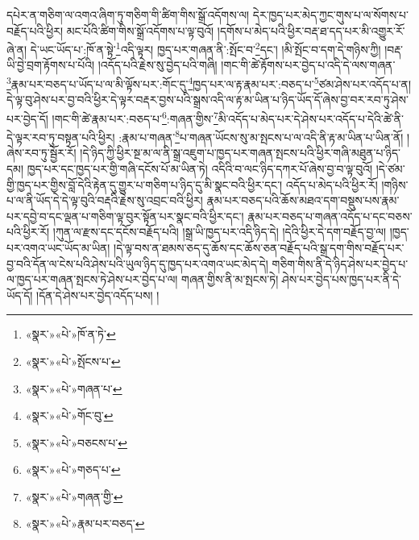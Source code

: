 དཔེར་ན་གཅིག་ལ་འགའ་ཞིག་ཏུ་གཅིག་གི་ཚིག་གིས་སྒྲོ་འདོགས་ལ། དེར་ཁྱད་པར་མེད་ཀྱང་གུས་པ་ལ་སོགས་པ་བརྗོད་པའི་ཕྱིར། མང་པོའི་ཚིག་གིས་སྒྲོ་འདོགས་པ་ལྟ་བུའོ། །དགོས་པ་མེད་པའི་ཕྱིར་བརྡ་ཐ་དད་པར་མི་འགྱུར་རོ་ཞེ་ན། དེ་ཡང་ཡོད་པ་:ཁོ་ན་སྟེ་\footnote{«སྣར་»«པེ་»ཁོ་ན་ཏེ་}འདི་ལྟར། ཁྱད་པར་གཞན་ནི་:སྤོང་བ་\footnote{«སྣར་»«པེ་»སྤོངས་པ་}དང་། །མི་སྤོང་བ་དག་དེ་གཉིས་ཀྱི། །བརྡ་ཡི་བྱེ་བྲག་རྟོགས་པ་པོའི། །འདོད་པའི་རྗེས་སུ་བྱེད་པའི་གཞི། །གང་གི་ཚེ་རྟོགས་པར་བྱེད་པ་འདི་དེ་ལས་གཞན་\footnote{«སྣར་»«པེ་»གཞན་པ་}རྣམ་པར་བཅད་པ་ཡོད་པ་ལ་མི་ལྟོས་པར་:གོང་དུ་\footnote{«སྣར་»«པེ་»གོང་བུ་}ཁྱད་པར་ལ་རྟ་རྣམ་པར་:བཅད་པ་\footnote{«སྣར་»«པེ་»བཅངས་པ་}ཙམ་ཤེས་པར་འདོད་པ་ན། དེ་ལྟ་བུ་ཤེས་པར་བྱ་བའི་ཕྱིར་དེ་ལྟར་བརྡར་བྱས་པའི་སྒྲས་འདི་ལ་རྟ་མ་ཡིན་པ་ཉིད་ཡོད་དོ་ཞེས་བྱ་བར་རབ་ཏུ་ཤེས་པར་བྱེད་དོ། །གང་གི་ཚེ་རྣམ་པར་:བཅད་པ་\footnote{«སྣར་»«པེ་»གཅད་པ་}:གཞན་གྱིས་\footnote{«སྣར་»«པེ་»གཞན་གྱི་}མི་འདོད་པ་མེད་པར་དེ་ཤེས་པར་འདོད་པ་དེའི་ཚེ་ནི་དེ་ལྟར་རབ་ཏུ་བསྟན་པའི་ཕྱིར། :རྣམ་པ་གཞན་\footnote{«སྣར་»«པེ་»རྣམ་པར་བཅད་}པ་གཞན་ཡོངས་སུ་མ་སྤངས་པ་ལ་འདི་ནི་རྟ་མ་ཡིན་པ་ཡིན་ནོ། །ཞེས་རབ་ཏུ་སྦྱོར་རོ། །དེ་ཉིད་ཀྱི་ཕྱིར་སྔ་མ་ལ་ནི་སྒྲ་འཇུག་པ་ཁྱད་པར་གཞན་སྤངས་པའི་ཕྱིར་གཞི་མཐུན་པ་ཉིད་དམ། ཁྱད་པར་དང་ཁྱད་པར་གྱི་གཞི་དངོས་པོ་མ་ཡིན་ཏེ། འདིའི་བ་ལང་ཉིད་དཀར་པོ་ཞེས་བྱ་བ་ལྟ་བུའོ། །དེ་ཙམ་གྱི་ཁྱད་པར་གྱིས་བློ་དེའི་རྟེན་དུ་གྱུར་པ་གཅིག་པ་ཉིད་དུ་མི་སྣང་བའི་ཕྱིར་དང་། འདོད་པ་མེད་པའི་ཕྱིར་རོ། །གཉིས་པ་ལ་ནི་ཡོད་དེ་དེ་ལྟ་བུའི་བརྡའི་རྗེས་སུ་འབྲང་བའི་ཕྱིར། རྣམ་པར་བཅད་པའི་ཆོས་མཐའ་དག་བསྡུས་པས་རྣམ་པར་དབྱེ་བ་དང་ལྡན་པ་གཅིག་ལྟ་བུར་སྟོན་པར་སྣང་བའི་ཕྱིར་དང་། རྣམ་པར་བཅད་པ་གཞན་འདོད་པ་དང་བཅས་པའི་ཕྱིར་རོ། །ཀུན་ལ་རྫས་དང་དངོས་བརྗོད་པའི། །སྒྲ་ཡི་ཁྱད་པར་འདི་ཉིད་དེ། །དེའི་ཕྱིར་དེ་དག་བརྗོད་བྱ་ལ། །ཁྱད་པར་འགའ་ཡང་ཡོད་མ་ཡིན། །དེ་ལྟ་བས་ན་ཐམས་ཅད་དུ་ཆོས་དང་ཆོས་ཅན་བརྗོད་པའི་སྒྲ་དག་གིས་བརྗོད་པར་བྱ་བའི་དོན་ལ་ངེས་པའི་ཤེས་པའི་ཡུལ་ཉིད་དུ་ཁྱད་པར་འགའ་ཡང་མེད་དེ། གཅིག་གིས་ནི་དེ་ཉིད་ཤེས་པར་བྱེད་པ་ལ་ཁྱད་པར་གཞན་སྤངས་ཏེ་ཤེས་པར་བྱེད་པ་ལ། གཞན་གྱིས་ནི་མ་སྤངས་ཏེ། ཤེས་པར་བྱེད་པས་ཁྱད་པར་ནི་དེ་ཡོད་དོ། །དོན་དེ་ཤེས་པར་བྱེད་འདོད་པས། །
